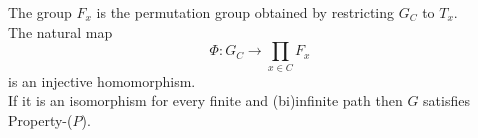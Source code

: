 \documentclass[preview]{standalone}
\begin{document}
The group $F_{x}$ is the permutation group obtained by restricting $G_{C}$ to $T_{x}$.\\The natural map \[\Phi : G_{C} \to \prod_{x \in C} F_{x}\] is an injective homomorphism.\\If it is an isomorphism for every finite and (bi)infinite path then $G$ satisfies Property-($P$).\\
\end{document}
